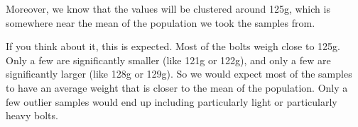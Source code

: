 \documentclass[../../../main.tex]{subfiles}
\begin{document}
\noindent
Moreover, we know that the values will be clustered around 125g, which is somewhere near the mean of the population we took the samples from. 

If you think about it, this is expected. Most of the bolts weigh close to 125g. Only a few are significantly smaller (like 121g or 122g), and only a few are significantly larger (like 128g or 129g). So we would expect most of the samples to have an average weight that is closer to the mean of the population. Only a few outlier samples would end up including particularly light or particularly heavy bolts.
\end{document}
